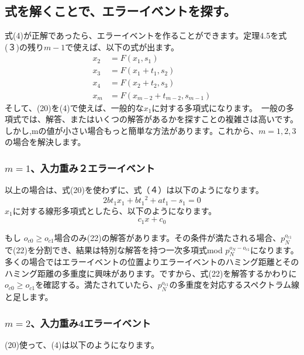 \documentclass[20 pts]{article}
\begin{document}
\subsection{式を解くことで、エラーイベントを探す。}
式(4)が正解であったら、エラーイベントを作ることができます。定理4.5を式(３)の残り$m-1$で使えば、以下の式が出ます。
\begin{align*}
x_2&=F(x_1, s_1 )\\
x_3&=F(x_1 +t_1,s_2 )\\
x_4&=F(x_2 +t_2,s_3 )\\
x_m&=F(x_{m-2} +t_{m-2},s_{m-1} )	\tag{20}
\end{align*}
そして、(20)を(4)で使えば、一般的な$x_1$に対する多項式になります。　一般の多項式では、解答、またはいくつの解答があるかを探すことの複雑さは高いです。しかし,mの値が小さい場合もっと簡単な方法があります。これから、$m=1,2,3$の場合を解決します。
\newpage
\subsubsection{$m=1$、入力重み２エラーイベント}
以上の場合は、式(20)を使わずに、式（４）は以下のようになります。
\begin{equation}\tag{21}
2bt_1 x_1+b{t_1}^2+at_1-s_1=0	
\end{equation}				
$x_1$に対する線形多項式としたら、以下のようになります。
\begin{equation}\tag{22}
c_1 x+c_0
\end{equation}
						
もし	$o_{c0}  \geq o_{c1}$場合のみ(22)の解答があります。その条件が満たされる場合、$p_N^{o_{c1}}$で(22)を分割でき、結果は特別な解答を持つ一次多項式mod $p_N^{o_N-o_{c1}}$になります。多くの場合ではエラーイベントの位置よりエラーイベントのハミング距離とそのハミング距離の多重度に興味があります。ですから、式(22)を解答するかわりに$o_{c0} \geq o_{c1}$を確認する。満たされていたら、$p_N^{o_{c1}}$の多重度を対応するスペクトラム線と足します。

\subsubsection{$m=2$、入力重み4エラーイベント}
(20)使って、(4)は以下のようになります。
\end{document}
